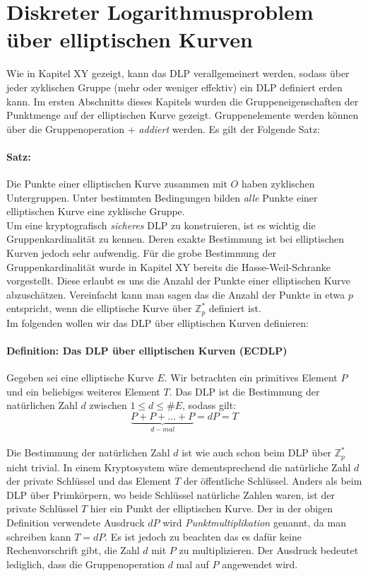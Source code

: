 \section{Diskreter Logarithmusproblem über elliptischen Kurven} \label{sec:DLPüberEC}
Wie in Kapitel XY gezeigt, kann das DLP verallgemeinert werden, sodass über jeder zyklischen Gruppe (mehr oder weniger effektiv) ein DLP definiert erden kann. Im ersten Abschnitts dieses Kapitels wurden die Gruppeneigenschaften der Punktmenge auf der elliptischen Kurve gezeigt. Gruppenelemente werden können über die Gruppenoperation $+$ \textit{addiert} werden. Es gilt der Folgende Satz:

\paragraph{Satz:}
Die Punkte einer elliptischen Kurve zusammen mit $O$ haben zyklischen Untergruppen. Unter bestimmten Bedingungen bilden \textit{alle} Punkte einer elliptischen Kurve eine zyklische Gruppe.\\

Um eine kryptografisch \textit{sicheres} DLP zu konstruieren, ist es wichtig die Gruppenkardinalität zu kennen. Deren exakte Bestimmung ist bei elliptischen Kurven jedoch sehr aufwendig. Für die grobe Bestimmung der Gruppenkardinalität wurde in Kapitel XY bereits die Hasse-Weil-Schranke vorgestellt. Diese erlaubt es uns die Anzahl der Punkte einer elliptischen Kurve abzuschätzen. Vereinfacht kann man sagen das die Anzahl der Punkte in etwa $p$ entspricht, wenn die elliptische Kurve über $\mathbb{Z}^*_p$ definiert ist.\\

Im folgenden wollen wir das DLP über elliptischen Kurven definieren:

\paragraph{Definition: Das DLP über elliptischen Kurven (ECDLP)}
Gegeben sei eine elliptische Kurve $E$. Wir betrachten ein primitives Element $P$ und ein beliebiges weiteres Element $T$. Das DLP ist die Bestimmung der natürlichen Zahl $d$ zwischen $1 \leq d \leq \#E$, sodass gilt:
$$\underbrace{P + P + \dots + P}_{d-mal} = d P = T$$\\

Die Bestimmung der natürlichen Zahl $d$ ist wie auch schon beim DLP über $\mathbb{Z}^*_p$ nicht trivial. In einem Kryptosystem wäre dementsprechend die natürliche Zahl $d$ der private Schlüssel und das Element $T$ der öffentliche Schlüssel. Anders als beim DLP über Primkörpern, wo beide Schlüssel natürliche Zahlen waren, ist der private Schlüssel $T$ hier ein Punkt der elliptischen Kurve. Der in der obigen Definition verwendete Ausdruck $dP$ wird \textit{Punktmultiplikation} genannt, da man schreiben kann $T = dP$. Es ist jedoch zu beachten das es dafür keine Rechenvorschrift gibt, die Zahl $d$ mit $P$ zu multiplizieren. Der Ausdruck bedeutet lediglich, dass die Gruppenoperation $d$ mal auf $P$ angewendet wird.\\

